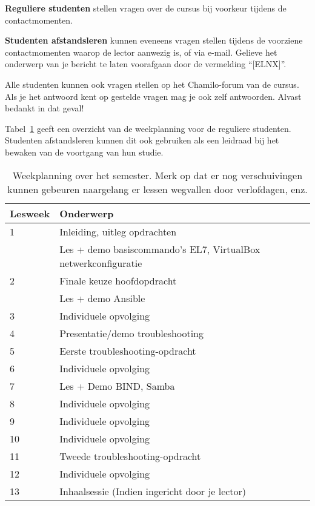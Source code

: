 \textbf{Reguliere studenten} stellen vragen over de cursus bij voorkeur tijdens de contactmomenten.

\textbf{Studenten afstandsleren} kunnen eveneens vragen stellen tijdens de voorziene contactmomenten waarop de lector aanwezig is, of via e-mail. Gelieve het onderwerp van je bericht te laten voorafgaan door de vermelding ``[ELNX]''.

Alle studenten kunnen ook vragen stellen op het Chamilo-forum van de cursus. Als je het antwoord kent op gestelde vragen mag je ook zelf antwoorden. Alvast bedankt in dat geval!

Tabel~\ref{tab:weekplanning} geeft een overzicht van de weekplanning voor de reguliere studenten. Studenten afstandsleren kunnen dit ook gebruiken als een leidraad bij het bewaken van de voortgang van hun studie.

\begin{table}
  \centering
  \begin{tabular}{ll}
    \toprule
    \textbf{Lesweek} & \textbf{Onderwerp}                                             \\
    \midrule
    1  & Inleiding, uitleg opdrachten                                   \\
       & Les + demo basiscommando's EL7, VirtualBox netwerkconfiguratie \\
    2  & Finale keuze hoofdopdracht                                     \\
       & Les + demo Ansible                                             \\
    3  & Individuele opvolging                                          \\
    4  & Presentatie/demo troubleshooting                               \\
    5  & Eerste troubleshooting-opdracht                                \\
    6  & Individuele opvolging                                          \\
    7  & Les + Demo BIND, Samba                                         \\
    8  & Individuele opvolging                                          \\
    9  & Individuele opvolging                                          \\
    10 & Individuele opvolging                                          \\
    11 & Tweede troubleshooting-opdracht                                \\
    12 & Individuele opvolging                                          \\
    13 & Inhaalsessie (Indien ingericht door je lector)
  \end{tabular}
  \caption{Weekplanning over het semester. Merk op dat er nog verschuivingen kunnen gebeuren naargelang er lessen wegvallen door verlofdagen, enz.}
  \label{tab:weekplanning}
\end{table}


